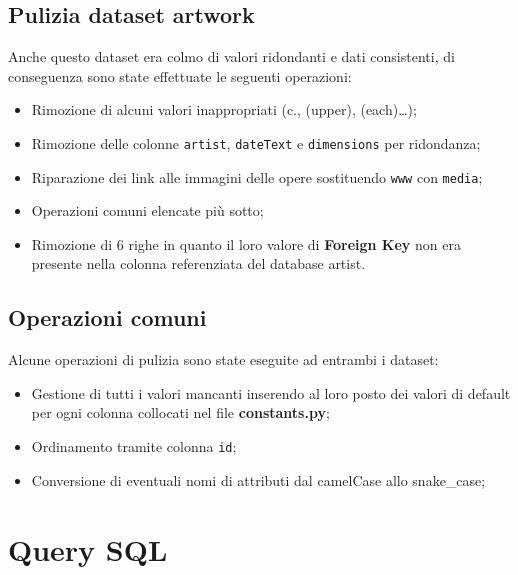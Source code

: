 \documentclass{ol-softwaremanual}
\begin{document}
\subsection{Pulizia dataset artwork}
Anche questo dataset era colmo di valori ridondanti e dati consistenti, di conseguenza sono state effettuate le seguenti operazioni:
\begin{itemize}
    \item Rimozione di alcuni valori inappropriati (c., (upper), (each)…);
    \item Rimozione delle colonne \verb|artist|, \verb|dateText| e \verb|dimensions| per ridondanza;
    \item Riparazione dei link alle immagini delle opere sostituendo \verb|www| con \verb|media|;
    \item Operazioni comuni elencate più sotto;
    \item Rimozione di 6 righe in quanto il loro valore di \textbf{Foreign Key} non era presente nella colonna referenziata del database artist.
\end{itemize}

\newpage
\subsection{Operazioni comuni}
Alcune operazioni di pulizia sono state eseguite ad entrambi i dataset:
\begin{itemize}
    \item Gestione di tutti i valori mancanti inserendo al loro posto dei valori di default per ogni colonna collocati nel 
    file \textbf{constants.py};
    \item Ordinamento tramite colonna \verb|id|;
    \item Conversione di eventuali nomi di attributi dal camelCase allo snake\_case;
\end{itemize}

\section{Query SQL}
\end{document}
